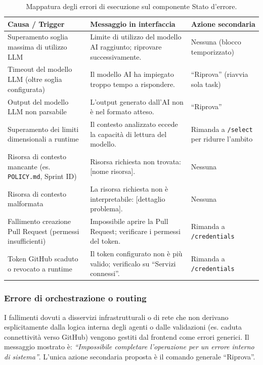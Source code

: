 \documentclass[11pt,a4paper]{article}
\begin{document}
\begin{table}[H]
\centering
\caption{Mappatura degli errori di esecuzione sul componente Stato d'errore.}
\label{tab:fe-errori-mappatura}
\vspace{2mm}
\renewcommand{\arraystretch}{1.2}
\begin{tabularx}{\textwidth}{|X|X|l|}
\hline
\textbf{Causa / Trigger} & \textbf{Messaggio in interfaccia} & \textbf{Azione secondaria} \\ \hline
Superamento soglia massima di utilizzo LLM & Limite di utilizzo del modello AI raggiunto; riprovare successivamente. & Nessuna (blocco temporizzato) \\ \hline
Timeout del modello LLM (oltre soglia configurata) & Il modello AI ha impiegato troppo tempo a rispondere. & ``Riprova'' (riavvia sola task) \\ \hline
Output del modello LLM non parsabile & L'output generato dall'AI non è nel formato atteso. & ``Riprova'' \\ \hline
Superamento dei limiti dimensionali a runtime & Il contesto analizzato eccede la capacità di lettura del modello. & Rimanda a \texttt{/select} per ridurre l'ambito \\ \hline
Risorsa di contesto mancante (es. \texttt{POLICY.md}, Sprint ID) & Risorsa richiesta non trovata: [nome risorsa]. & Nessuna \\ \hline
Risorsa di contesto malformata & La risorsa richiesta non è interpretabile: [dettaglio problema]. & Nessuna \\ \hline
Fallimento creazione Pull Request (permessi insufficienti) & Impossibile aprire la Pull Request; verificare i permessi del token. & Rimanda a \texttt{/credentials} \\ \hline
Token GitHub scaduto o revocato a runtime & Il token configurato non è più valido; verificalo su ``Servizi connessi''. & Rimanda a \texttt{/credentials} \\ \hline
\end{tabularx}
\end{table}

\subsubsection{Errore di orchestrazione o routing}

I fallimenti dovuti a disservizi infrastrutturali o di rete che non derivano esplicitamente dalla logica interna degli agenti o dalle validazioni (es. caduta connettività verso GitHub) vengono gestiti dal frontend come errori generici. Il messaggio mostrato è: \emph{``Impossibile completare l'operazione per un errore interno di sistema''}. L'unica azione secondaria proposta è il comando generale ``Riprova''.
\end{document}
